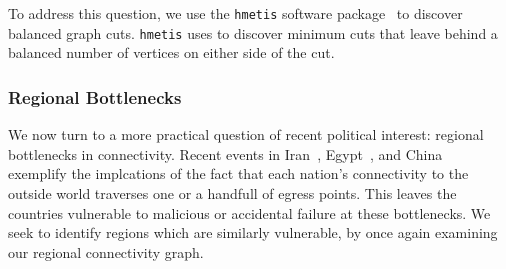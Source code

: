     To address this question, we use the {\tt hmetis} software package~\cite{hmetis} to discover balanced graph cuts.
    {\tt hmetis} uses  to discover minimum cuts that leave behind a balanced number of vertices on either side of the cut.
 
    \subsubsection*{Regional Bottlenecks}
    We now turn to a more practical question of recent political interest: regional bottlenecks in connectivity.
    Recent events in Iran~\cite{iran}, Egypt~\cite{egypt}, and China~\cite{china} exemplify the implcations of the fact that each nation's connectivity to the outside world traverses one or a handfull of egress points.
    This leaves the countries vulnerable to malicious or accidental failure at these bottlenecks.
    We seek to identify regions which are similarly vulnerable, by once again examining our regional connectivity graph. 
